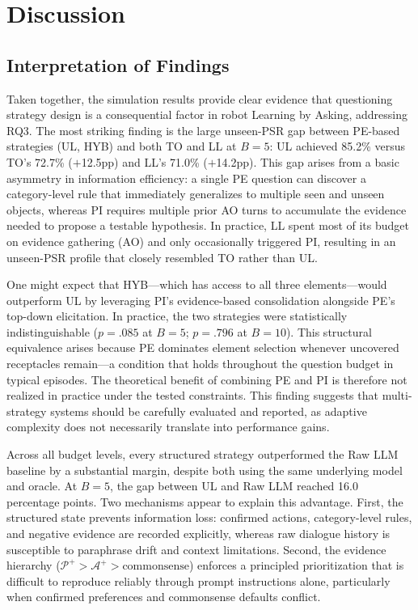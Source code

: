 \documentclass[manuscript,review,anonymous]{acmart}
\newcommand{\revstart}{\color{revcolor}}  %
\renewcommand{\revstart}{}
\begin{document}
\section{Discussion}
\label{sec:discussion}
{\revstart

\subsection{Interpretation of Findings}

Taken together, the simulation results provide clear evidence that questioning strategy design is a consequential factor in robot Learning by Asking, addressing RQ3. The most striking finding is the large unseen-PSR gap between PE-based strategies (UL, HYB) and both TO and LL at $B=5$: UL achieved 85.2\% versus TO's 72.7\% ($+$12.5pp) and LL's 71.0\% ($+$14.2pp). This gap arises from a basic asymmetry in information efficiency: a single PE question can discover a category-level rule that immediately generalizes to multiple seen and unseen objects, whereas PI requires multiple prior AO turns to accumulate the evidence needed to propose a testable hypothesis. In practice, LL spent most of its budget on evidence gathering (AO) and only occasionally triggered PI, resulting in an unseen-PSR profile that closely resembled TO rather than UL.

One might expect that HYB---which has access to all three elements---would outperform UL by leveraging PI's evidence-based consolidation alongside PE's top-down elicitation. In practice, the two strategies were statistically indistinguishable ($p = .085$ at $B=5$; $p = .796$ at $B=10$). This structural equivalence arises because PE dominates element selection whenever uncovered receptacles remain---a condition that holds throughout the question budget in typical episodes. The theoretical benefit of combining PE and PI is therefore not realized in practice under the tested constraints. This finding suggests that multi-strategy systems should be carefully evaluated and reported, as adaptive complexity does not necessarily translate into performance gains.

Across all budget levels, every structured strategy outperformed the Raw LLM baseline by a substantial margin, despite both using the same underlying model and oracle. At $B=5$, the gap between UL and Raw LLM reached 16.0 percentage points. Two mechanisms appear to explain this advantage. First, the structured state prevents information loss: confirmed actions, category-level rules, and negative evidence are recorded explicitly, whereas raw dialogue history is susceptible to paraphrase drift and context limitations. Second, the evidence hierarchy ($\mathcal{P}^+ > \mathcal{A}^+ > \text{commonsense}$) enforces a principled prioritization that is difficult to reproduce reliably through prompt instructions alone, particularly when confirmed preferences and commonsense defaults conflict.

}
\end{document}
